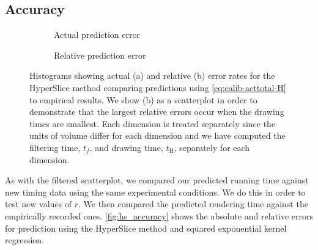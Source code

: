 \begin{table}[h]
\centering
\caption[Rendering time calibration results]{%
  Table showing the calibrated parameters, $a$, $t_f$, and $t_\text{H}$,
  as a result of running a segmented regression fit using the data we gathered
  from our timing experiments and \autoref{eq:expanded-regression}.
  The factors $t_f$ and $t_\text{H}$ are in nanoseconds and $a$ is defined
  in terms of fragments per sample.
}

\label{tbl:model_fits}
\end{table}

\subsection{Accuracy}
 
\begin{figure*}[t]
  \centering
  \begin{subfigure}{0.5\textwidth}
    
    \caption{Actual prediction error}
    \label{fig:hs_abs_error}
  \end{subfigure}%
  \begin{subfigure}{0.5\textwidth}
    
    \caption{Relative prediction error}
    \label{fig:hs_rel_error}
  \end{subfigure}
  \caption[Actual and relative error rates of prediction]{%
    Histograms showing actual (a) and relative (b) error rates
    for the HyperSlice method
    comparing predictions using \autoref{eq:calib-acttotal-H} to empirical 
    results.  We show (b) as a scatterplot in order to demonstrate that
    the largest relative errors occur when the drawing times are 
    smallest.
    Each dimension is treated separately since the units of volume differ
    for each dimension and we have computed the filtering time, $t_f$,
    and drawing time, $t_\text{H}$, separately for each dimension.
  }
  \label{fig:hs_accuracy}
\end{figure*}

As with the filtered scatterplot, we compared our predicted running time
against new timing data using the same experimental conditions.  We do this
in order to test new values of $r$.  We then compared the predicted 
rendering time against the empirically recorded ones. 
\autoref{fig:hs_accuracy} shows the absolute and relative
errors for prediction using the HyperSlice method and squared exponential 
kernel regression.


